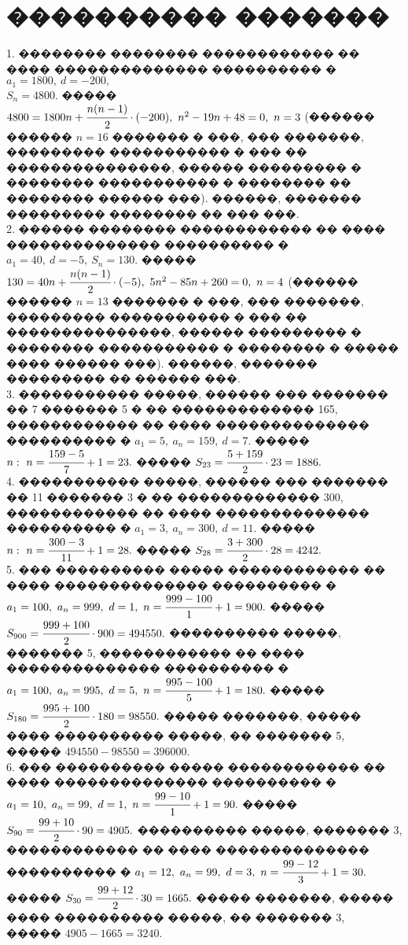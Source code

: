 \documentclass[12pt]{article}
\begin{document}
\section{���������� �������}
1. �������� �������� ������������ �� ���� �������������� ���������� � $a_1=1800,\ d=-200,$\\$S_n=4800.$ ����� $4800=1800n+\cfrac{n(n-1)}{2}\cdot(-200),\
n^2-19n+48=0,\ n=3$ (������ ������ $n=16$ ������� � ���, ��� �������, ��������� ����������� � ��� �� ���������������, ������ ��������� � �������� ����������� � �������� �� �������� ������ ���). ������, ������� ��������� �������� �� ��� ���.\\
2. ������ �������� ������������ �� ���� �������������� ���������� � $a_1=40,\ d=-5,\ S_n=130.$ ����� $130=40n+\cfrac{n(n-1)}{2}\cdot(-5),\
5n^2-85n+260=0,\ n=4$ (������ ������ $n=13$ ������� � ���, ��� �������, ��������� ����������� � ��� �� ���������������, ������ ��������� � �������� ����������� � �������� � ����� ���� ������ ���). ������, ������� ��������� �� ������ ���.\\
3. ����������� �����, ������ ��� ������� �� 7 ������� 5 � �� ������������� 165, ������������ �� ���� �������������� ���������� � $a_1=5,\ a_n=159,\ d=7.$ ����� $n:\ n=\cfrac{159-5}{7}+1=23.$ ����� $S_{23}=\cfrac{5+159}{2}\cdot23=1886.$\\
4. ����������� �����, ������ ��� ������� �� 11 ������� 3 � �� ������������� 300, ������������ �� ���� �������������� ���������� � $a_1=3,\ a_n=300,\ d=11.$ ����� $n:\ n=\cfrac{300-3}{11}+1=28.$ ����� $S_{28}=\cfrac{3+300}{2}\cdot28=4242.$\\
5. ��� ���������� ����� ������������ �� ���� �������������� ���������� � $a_1=100,\ a_n=999,\ d=1,\ n=\cfrac{999-100}{1}+1=900.$ ����� $S_{900}=\cfrac{999+100}{2}\cdot900=494550.$ ���������� �����, ������� 5, ������������ �� ���� �������������� ���������� � $a_1=100,\ a_n=995,\ d=5,\ n=\cfrac{995-100}{5}+1=180.$ ����� $S_{180}=\cfrac{995+100}{2}\cdot180=98550.$ ����� �������, ����� ���� ���������� �����, �� ������� 5, ����� $494550-98550=396000.$\\
6. ��� ���������� ����� ������������ �� ���� �������������� ���������� � $a_1=10,\ a_n=99,\ d=1,\ n=\cfrac{99-10}{1}+1=90.$ ����� $S_{90}=\cfrac{99+10}{2}\cdot90=4905.$ ���������� �����, ������� 3, ������������ �� ���� �������������� ���������� � $a_1=12,\ a_n=99,\ d=3,\ n=\cfrac{99-12}{3}+1=30.$ ����� $S_{30}=\cfrac{99+12}{2}\cdot30=1665.$ ����� �������, ����� ���� ���������� �����, �� ������� 3, ����� $4905-1665=3240.$\\
\end{document}
